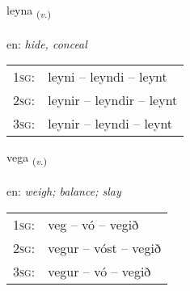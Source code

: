 \documentclass[frontgrid, backgrid]{flacards}\usepackage[]{graphicx}\usepackage[]{color}
\begin{document}
\renewcommand{\blhead}{\vskip5pt {\small\bfseries\footnotesize Sagnorð | Verb }}
\renewcommand{\bcfoot}{\vskip5pt \hspace{2pt}{\small\bfseries\footnotesize 2K}}


{leyna \small{\textsubscript{(\textit{v.})}} \\[1ex] %
\textphonetic{[leiːna]} \\
en: \emph{hide, conceal} \\  [2ex]
\renewcommand*{\arraystretch}{0.8}
\begin{tabular}{p{1cm}l}
\textsc{1sg}: & leyni -- leyndi -- leynt \\ 
\textsc{2sg}: & leynir -- leyndir -- leynt \\ 
\textsc{3sg}: & leynir -- leyndi -- leynt \\ 
\end{tabular}
}

\renewcommand{\flhead}{\vskip5pt \fboxsep=0pt {\small\bfseries\footnotesize Sagnorð | Verb}}
\renewcommand{\fcfoot}{\vskip5pt \fboxsep=0pt \hspace{2pt}{\small\bfseries\footnotesize 2K}}

\renewcommand{\blhead}{\vskip5pt {\small\bfseries\footnotesize Sagnorð | Verb }}
\renewcommand{\bcfoot}{\vskip5pt \hspace{2pt}{\small\bfseries\footnotesize 2K}}


{vega \small{\textsubscript{(\textit{v.})}} \\[1ex] %
\textphonetic{[vɛːɣa]} \\
en: \emph{weigh; balance; slay} \\  [2ex]
\renewcommand*{\arraystretch}{0.8}
\begin{tabular}{p{1cm}l}
\textsc{1sg}: & veg -- vó -- vegið \\ 
\textsc{2sg}: & vegur -- vóst -- vegið \\ 
\textsc{3sg}: & vegur -- vó -- vegið \\ 
\end{tabular}
}
\end{document}
